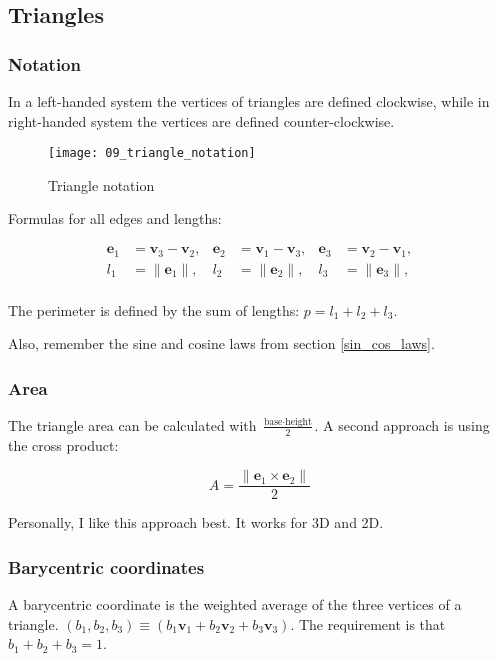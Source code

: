 \subsection{Triangles}

\subsubsection{Notation}

In a left-handed system the vertices of triangles are defined clockwise, while in right-handed system the vertices are defined counter-clockwise.

\begin{figure}[H]
\centering
    \texttt{[image: 09\_triangle\_notation]}
\caption{Triangle notation}
\label{fig:triangle-notation}
\end{figure}

Formulas for all edges and lengths:

\begin{align*}
\textbf{e}_1 &= \textbf{v}_3 - \textbf{v}_2, & \textbf{e}_2 &= \textbf{v}_1 - \textbf{v}_3, & \textbf{e}_3 &= \textbf{v}_2 - \textbf{v}_1, \\
l_1& = \|\textbf{e}_1\|, & l_2 &= \|\textbf{e}_2\|, & l_3 &= \|\textbf{e}_3\|, \\
\end{align*}

The perimeter is defined by the sum of lengths: $p = l_1 + l_2 + l_3$.

Also, remember the sine and cosine laws from section \ref{sin_cos_laws}.

\subsubsection{Area}

The triangle area can be calculated with $\frac{\text{base}\cdot{}\text{height}}{2}$. A second approach is using the cross product: 

$$A=\frac{\| \textbf{e}_1 \times \textbf{e}_2 \|}{2}$$

\noindent{} Personally, I like this approach best. It works for 3D and 2D.

\subsubsection{Barycentric coordinates}

A barycentric coordinate is the weighted average of the three vertices of a triangle. $(b_1, b_2, b_3) \equiv (b_1\textbf{v}_1+b_2\textbf{v}_2+b_3\textbf{v}_3)$. The requirement is that $b_1+b_2+b_3=1$.

